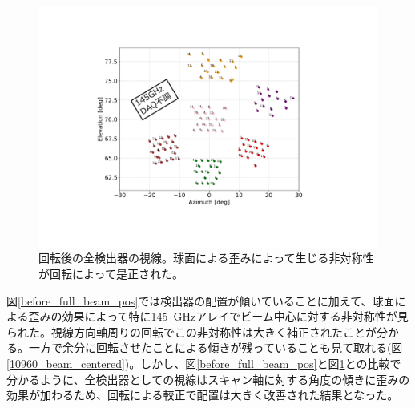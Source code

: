 \begin{figure}[htbp]
  \centering
  \includegraphics[width=1.0\columnwidth]{5_alignment/figs/after_full_pos_70_mod.pdf}
  \caption{回転後の全検出器の視線。球面による歪みによって生じる非対称性が回転によって是正された。}
  \label{after_full_pos_70}
\end{figure}
図\ref{before_full_beam_pos}では検出器の配置が傾いていることに加えて、球面による歪みの効果によって特に\SI{145}{GHz}アレイでビーム中心に対する非対称性が見られた。視線方向軸周りの回転でこの非対称性は大きく補正されたことが分かる。一方で余分に回転させたことによる傾きが残っていることも見て取れる(図\ref{10960_beam_centered})。しかし、図\ref{before_full_beam_pos}と図\ref{after_full_pos_70}との比較で分かるように、全検出器としての視線はスキャン軸に対する角度の傾きに歪みの効果が加わるため、回転による較正で配置は大きく改善された結果となった。
